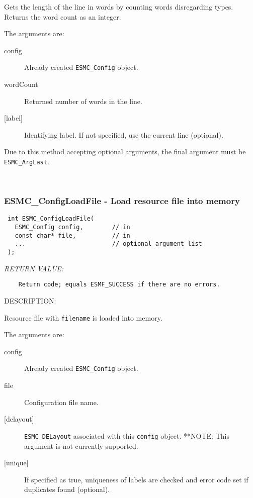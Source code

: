     Gets the length of the line in words by counting words
    disregarding types.  Returns the word count as an integer.
  
     The arguments are:
     \begin{description}
     \item [config]
       Already created {\tt ESMC\_Config} object.
     \item [wordCount]
       Returned number of words in the line. 
     \item [{[label]}]
       Identifying label.  If not specified, use the current line (optional).
     \end{description}
  
    Due to this method accepting optional arguments, the final argument
    must be {\tt ESMC\_ArgLast}.
   
 
\mbox{}\hrulefill\ 
 
\subsubsection [ESMC\_ConfigLoadFile] {ESMC\_ConfigLoadFile - Load resource file into memory}


  
\begin{verbatim} int ESMC_ConfigLoadFile(
   ESMC_Config config,        // in
   const char* file,          // in
   ...                        // optional argument list
 );\end{verbatim}{\em RETURN VALUE:}
\begin{verbatim}    Return code; equals ESMF_SUCCESS if there are no errors.\end{verbatim}
{\sf DESCRIPTION:\\ }


    Resource file with {\tt filename} is loaded into memory.
  
     The arguments are:
     \begin{description}
     \item [config]
       Already created {\tt ESMC\_Config} object.
     \item [file]
       Configuration file name.
     \item [{[delayout]}]
       {\tt ESMC\_DELayout} associated with this {\tt config} object.
       **NOTE: This argument is not currently supported.
     \item [{[unique]}]
       If specified as true, uniqueness of labels are checked and 
       error code set if duplicates found (optional).
     \end{description}
  
